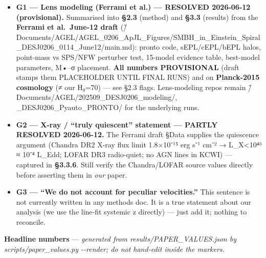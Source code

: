 \documentclass[
]{article}
\providecommand{\tightlist}{%
  \setlength{\itemsep}{0pt}\setlength{\parskip}{0pt}}
\newcommand{\BreakablePath}[1]{{\ttfamily\sloppy #1}}
\begin{document}
\begin{itemize}
\tightlist
\item
  \textbf{G1 --- Lens modeling (Ferrami et al.) --- RESOLVED 2026-06-12
  (provisional).} Summarised into \textbf{§2.3} (method) and
  \textbf{§3.3} (results) from the \textbf{Ferrami et al.~June-12 draft}
  (\BreakablePath{\~/\discretionary{}{}{}Documents/\discretionary{}{}{}AGEL/\discretionary{}{}{}AGEL\_\discretionary{}{}{}0206\_\discretionary{}{}{}ApJL\_\discretionary{}{}{}Figures/\discretionary{}{}{}SMBH\_\discretionary{}{}{}in\_\discretionary{}{}{}Einstein\_\discretionary{}{}{}Spiral\_\discretionary{}{}{}DESJ0206\_\discretionary{}{}{}0114\_\discretionary{}{}{}June12/\discretionary{}{}{}main.\discretionary{}{}{}md}):
  \BreakablePath{pronto} code, sEPL/cEPL/bEPL halos, point-mass vs
  SPS/NFW perturber test, 15-model evidence table, best-model
  parameters, M•--σ placement. \textbf{All numbers PROVISIONAL} (draft
  stamps them \BreakablePath{PLACEHOLDER UNTIL FINAL RUNS}) and on
  \textbf{Planck-2015 cosmology} (≠ our H₀=70) --- see §2.3 flags.
  Lens-modeling repos remain
  \BreakablePath{\~/\discretionary{}{}{}Documents/\discretionary{}{}{}AGEL/\discretionary{}{}{}202509\_\discretionary{}{}{}DESJ0206\_\discretionary{}{}{}modeling/\discretionary{}{}{}},
  \BreakablePath{20251112\_\discretionary{}{}{}DESJ0206\_\discretionary{}{}{}Pyauto\_\discretionary{}{}{}PRONTO/\discretionary{}{}{}}
  for the underlying runs.
\item
  \textbf{G2 --- X-ray / ``truly quiescent'' statement --- PARTLY
  RESOLVED 2026-06-12.} The Ferrami draft §Data supplies the quiescence
  argument (Chandra DR2 X-ray flux limit 1.8×10⁻¹⁵ erg s⁻¹ cm⁻² →
  L\_X\textless10⁴³ ≈ 10⁻⁴ L\_Edd; LOFAR DR3 radio-quiet; no AGN lines
  in KCWI) --- captured in \textbf{§3.3.6}. Still verify the
  Chandra/LOFAR source values directly before asserting them in
  \emph{our} paper.
\item
  \textbf{G3 --- ``We do not account for peculiar velocities.''} This
  sentence is not currently written in any methods doc. It is a true
  statement about our analysis (we use the line-fit systemic z directly)
  --- just add it; nothing to reconcile.
\end{itemize}

\textbf{Headline numbers} --- \emph{generated from
\BreakablePath{results/\discretionary{}{}{}PAPER\_\discretionary{}{}{}VALUES.\discretionary{}{}{}json}
by
\BreakablePath{scripts/\discretionary{}{}{}paper\_\discretionary{}{}{}values.\discretionary{}{}{}py -\discretionary{}{}{}-\discretionary{}{}{}render};
do not hand-edit inside the markers.}
\end{document}
